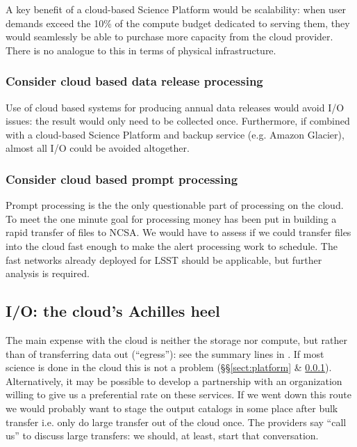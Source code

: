 A key benefit of a cloud-based Science Platform would be scalability: when user demands exceed the 10\% of the compute budget dedicated to serving them, they would seamlessly be able to purchase more capacity from the cloud provider.
There is no analogue to this in terms of physical infrastructure.

\subsubsection{Consider cloud based data release processing}
\label{sect:drp}

Use of cloud based systems for producing annual data releases would avoid I/O issues: the result would only need to be collected once.
Furthermore, if combined with a cloud-based Science Platform and backup service (e.g. Amazon Glacier), almost all I/O could be avoided altogether.

\subsubsection{Consider cloud based prompt processing}

Prompt processing is the the only questionable part of processing on the cloud.
To meet the one minute goal for processing money has been put in building a rapid transfer of files to NCSA.
We would have to assess if we could transfer files into the cloud fast enough to make the alert processing work to schedule.
The fast networks already deployed for LSST should be applicable, but further analysis is required.

\subsection{I/O: the cloud's Achilles heel}\label{sect:io}

The main expense with the cloud is neither the storage nor compute, but rather than of transferring data out (``egress''): see the summary lines in .
If most science is done in the cloud this is not a problem (\S\S\ref{sect:platform} \& \ref{sect:drp}).
Alternatively, it may be possible to develop a partnership with an organization willing to give us a preferential rate on these services.
If we went down this route we would probably want to stage the output catalogs in some place after bulk transfer i.e. only do large transfer out of the cloud once.
The providers say ``call us'' to discuss large transfers: we should, at least, start that conversation.

